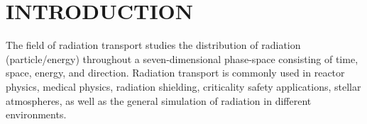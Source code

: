 %
%
%
%



\pagestyle{plain} %
\setcounter{page}{1}


\chapter{\uppercase {INTRODUCTION}}\label{cha:introduction}

The field of radiation transport studies the distribution of radiation (particle/energy) throughout a seven-dimensional phase-space consisting of time, space, energy, and direction. 
Radiation transport is commonly used in reactor physics, medical physics, radiation shielding, criticality safety applications, stellar atmospheres, as well as the general simulation of radiation in different environments. 

